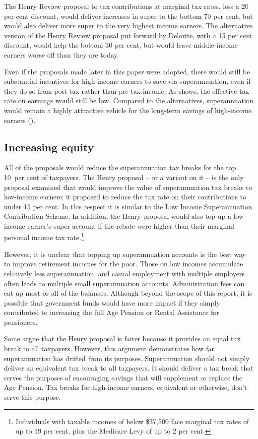 The Henry Review proposal to tax contributions at marginal tax rates, less a 20 per cent discount, would deliver increases in super to the bottom 70 per cent, but would also deliver more super to the very highest income earners. The alternative version of the Henry Review proposal put forward by Deloitte, with a 15 per cent discount, would help the bottom 30 per cent, but would leave middle-income earners worse off than they are today. 

Even if the proposals made later in this paper were adopted, there would still be substantial incentives for high income earners to save via superannuation, even if they do so from post-tax rather than pre-tax income. As  shows, the effective tax rate on earnings would still be low. Compared to the alternatives, superannuation would remain a highly attractive vehicle for the long-term savings of high-income earners ().

\subsection{Increasing equity}
All of the proposals would reduce the superannuation tax breaks for the top 10~per cent of taxpayers. The Henry proposal – or a variant on it – is the only proposal examined that would improve the value of superannuation tax breaks to low-income earners: it proposed to reduce the tax rate on their contributions to under 15 per cent. In this respect it is similar to the Low Income Superannuation Contribution Scheme. In addition, the Henry proposal would also top up a low-income earner’s super account if the rebate were higher than their marginal personal income tax rate.\footnote{Individuals with taxable incomes of below \$37,500 face marginal tax rates of up to 19 per cent, plus the Medicare Levy of up to 2 per cent.} 

However, it is unclear that topping up superannuation accounts is the best way to improve retirement incomes for the poor. Those on low incomes accumulate relatively less superannuation, and casual employment with multiple employers often leads to multiple small superannuation accounts. Administration fees can eat up most or all of the balances. Although beyond the scope of this report, it is possible that government funds would have more impact if they simply contributed to increasing the full Age Pension or Rental Assistance for pensioners.

Some argue that the Henry proposal is fairer because it provides an equal tax break to all taxpayers. However, this argument demonstrates how far superannuation has drifted from its purposes. Superannuation should not simply deliver an equivalent tax break to all taxpayers. It should deliver a tax break that serves the purposes of encouraging savings that will supplement or replace the Age Pension. Tax breaks for high-income earners, equivalent or otherwise, don’t serve this purpose.

